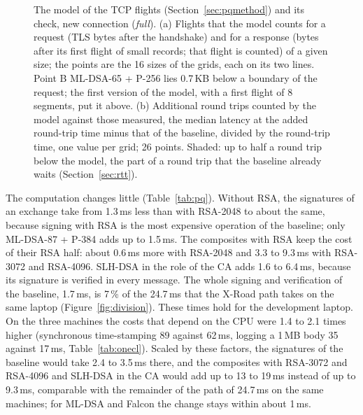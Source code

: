 \documentclass[conference,a4paper]{IEEEtran}
\newcommand{\newtext}[1]{{\color{blue}#1}}
\begin{document}
{\begin{figure}[!tb]
\caption{\newtext{The model of the TCP flights (Section~\ref{sec:pqmethod}) and its check, new
connection (\emph{full}). (a) Flights that the model counts for a request (TLS bytes after the
handshake) and for a response (bytes after its first flight of small records; that flight is
counted) of a given size; the points are the 16 sizes of the grids, each on its two lines. Point B
ML-DSA-65 + P-256 lies 0.7\,KB below a boundary of the request; the first version of the model,
with a first flight of 8 segments, put it above. (b) Additional round trips counted by the model
against those measured, \newtext{the median latency at the added round-trip time minus that of the
baseline, divided by the round-trip time}\newtext{, one value per grid}; 26 points.
Shaded: up to half a round trip below the model, the part of a round trip that the baseline already
waits (Section~\ref{sec:rtt}).}}
\label{fig:flights}
\end{figure}

\newtext{The computation changes little (Table~\ref{tab:pq}). Without RSA, the signatures of an
exchange take from 1.3\,ms less than with RSA-2048 to about the same, because signing with RSA is
the most expensive operation of the baseline; only ML-DSA-87 + P-384 adds up to 1.5\,ms. The
composites with RSA keep the cost of their RSA half: about 0.6\,ms more with RSA-2048 and 3.3 to
9.3\,ms with RSA-3072 and RSA-4096. SLH-DSA in the role of the CA adds 1.6 to 6.4\,ms, because its
signature is verified in every message.} The whole signing and verification of the
baseline, 1.7\,ms, is 7\,\% of the 24.7\,ms that the X-Road path takes on the same laptop
(\newtext{Figure~\ref{fig:division}}). \newtext{These times hold for the development laptop. On the three
machines the costs that depend on the CPU were 1.4 to 2.1 times higher (synchronous time-stamping 89
against 62\,ms, logging a 1\,MB body 35 against 17\,ms, Table~\ref{tab:onecl}). Scaled by these
factors, the signatures of the baseline would take 2.4 to 3.5\,ms there, and the composites with
RSA-3072 and RSA-4096 and SLH-DSA in the CA would add up to 13 to 19\,ms instead of up to 9.3\,ms,
comparable with the remainder of the path of 24.7\,ms on the same machines; for ML-DSA and Falcon
the change stays within about 1\,ms.}

}
\end{document}
